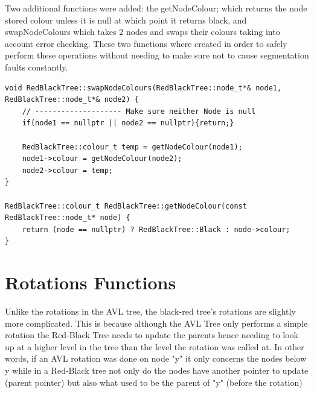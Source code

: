\documentclass[12pt, a4paper]{report}
\begin{document}
Two additional functions were added: the getNodeColour; which returns the node stored colour unless it is null at which point it returns black, and swapNodeColours which takes 2 nodes and swaps their colours taking into account error checking. These two functions where created in order to safely perform these operations without needing to make sure not to cause segmentation faults constantly.
\begin{verbatim}
void RedBlackTree::swapNodeColours(RedBlackTree::node_t*& node1, RedBlackTree::node_t*& node2) {
    // -------------------- Make sure neither Node is null
    if(node1 == nullptr || node2 == nullptr){return;}
    
    RedBlackTree::colour_t temp = getNodeColour(node1);
    node1->colour = getNodeColour(node2);
    node2->colour = temp;
}

RedBlackTree::colour_t RedBlackTree::getNodeColour(const RedBlackTree::node_t* node) {
    return (node == nullptr) ? RedBlackTree::Black : node->colour;
}
\end{verbatim}

\section{Rotations Functions}
Unlike the rotations in the AVL tree, the black-red tree's rotations are slightly more complicated. This is because although the AVL Tree only performs a simple rotation the Red-Black Tree needs to update the parents hence needing to look up at a higher level in the tree than the level the rotation was called at. In other words, if an AVL rotation was done on node "y" it only concerns the nodes below y while in a Red-Black tree not only do the nodes have another pointer to update (parent pointer) but also what used to be the parent of "y" (before the rotation)
\end{document}
